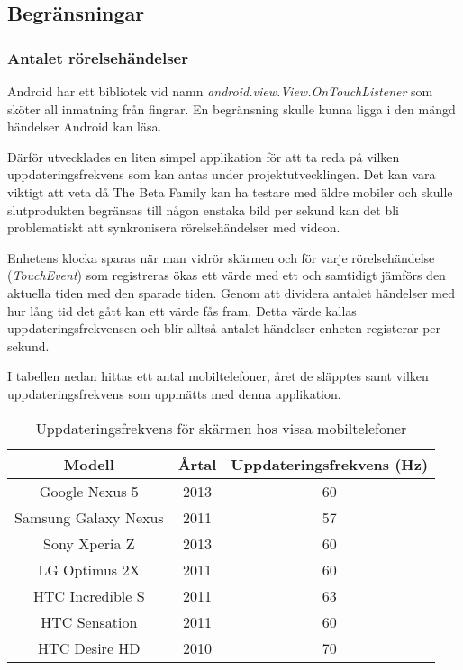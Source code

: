 \subsection{Begränsningar}
\label{subsec:constraints}

\subsubsection{Antalet rörelsehändelser}
\label{touchevents}
Android har ett bibliotek vid namn \emph{android.view.View.OnTouchListener}\parencite{touchlistener} som sköter all inmatning från fingrar. En begränsning skulle kunna ligga i den mängd händelser Android kan läsa. 

Därför utvecklades en liten simpel applikation för att ta reda på vilken uppdateringsfrekvens som kan antas under projektutvecklingen. Det kan vara viktigt att veta då The Beta Family kan ha testare med äldre mobiler och skulle slutprodukten begränsas till någon enstaka bild per sekund kan det bli problematiskt att synkronisera rörelsehändelser med videon.

Enhetens klocka sparas när man vidrör skärmen och för varje rörelsehändelse (\emph{TouchEvent}) som registreras ökas ett värde med ett och samtidigt jämförs den aktuella tiden med den sparade tiden. Genom att dividera antalet händelser med hur lång tid det gått kan ett värde fås fram. Detta värde kallas uppdateringsfrekvensen och blir alltså antalet händelser enheten registerar per sekund.

I tabellen nedan hittas ett antal mobiltelefoner, året de släpptes samt vilken uppdateringsfrekvens som uppmätts med denna applikation.
\begin{table}[h!]
	\begin{center}
	\begin{tabular}{| c | c | c |}
		\hline
		Modell & Årtal & Uppdateringsfrekvens (Hz) \\
		\hline
		Google Nexus 5 & 2013 & 60 \\
    Samsung Galaxy Nexus & 2011 & 57 \\
		Sony Xperia Z & 2013 & 60 \\
		LG Optimus 2X & 2011 & 60 \\
		HTC Incredible S & 2011 & 63 \\
		HTC Sensation & 2011 & 60 \\
		HTC Desire HD & 2010 & 70 \\
		\hline
	\end{tabular}
	\end{center}
	\caption{Uppdateringsfrekvens för skärmen hos vissa mobiltelefoner}
	\label{tab:freq}
\end{table}

